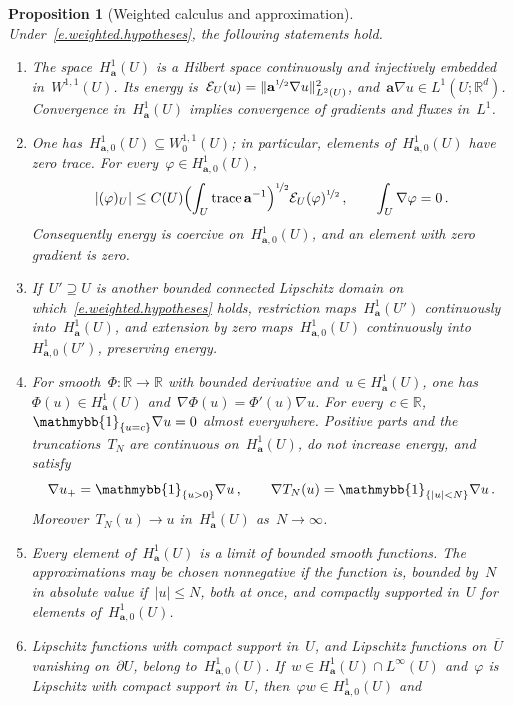 \documentclass[11pt,letterpaper]{article}
\numberwithin{equation}{section}
\newtheorem{proposition}[theorem]{Proposition}
\theoremstyle{definition}
\newcommand{\R}{\mathbb{R}}
\newcommand{\Rd}{\mathbb{R}^d}
\renewcommand{\a}{\mathbf{a}}
\newcommand{\nf}{\nicefrac}
\newcommand*{\tr}{\mathrm{trace\,}}
\DeclarePairedDelimiter{\norm}{\lVert}{\rVert}
\newcommand{\indc}{{\mathmybb{1}}}
\newcommand{\Ener}{\mathcal E}
\newcommand{\Hzero}[1]{H^1_{#1,0}}
\begin{document}
\begin{proposition}[Weighted calculus and approximation]
\label{p.weighted.calculus}
Under~\eqref{e.weighted.hypotheses}, the following statements hold.
\begin{enumerate}[label=\textup{(\roman*)}]
\item\label{i.weighted.identification} The space~$H^1_\a(U)$ is a Hilbert space continuously and injectively embedded in~$W^{1,1}(U)$. Its energy is~$\Ener_U(u)=\norm{\a^{\nf12}\nabla u}_{L^2(U)}^2$, and~$\a\nabla u\in L^1(U;\Rd)$. Convergence in~$H^1_\a(U)$ implies convergence of gradients and fluxes in~$L^1$.
\item\label{i.weighted.zero} One has~$\Hzero{\a}(U)\subseteq W^{1,1}_0(U)$; in particular, elements of~$\Hzero{\a}(U)$ have zero trace. For every~$\varphi\in\Hzero{\a}(U)$,
\begin{equation}
	|(\varphi)_U|\leq C(U)\Bigl(\int_U\tr\a^{-1}\Bigr)^{\nf12}\Ener_U(\varphi)^{\nf12}\,,\qquad \int_U\nabla\varphi=0\,.
	\label{e.weighted.coercivity}
\end{equation}
Consequently energy is coercive on~$\Hzero{\a}(U)$, and an element with zero gradient is zero.
\item\label{i.weighted.domains} If~$U'\supseteq U$ is another bounded connected Lipschitz domain on which~\eqref{e.weighted.hypotheses} holds, restriction maps~$H^1_\a(U')$ continuously into~$H^1_\a(U)$, and extension by zero maps~$\Hzero{\a}(U)$ continuously into~$\Hzero{\a}(U')$, preserving energy.
\item\label{i.weighted.chain} For smooth~$\Phi:\R\to\R$ with bounded derivative and~$u\in H^1_\a(U)$, one has~$\Phi(u)\in H^1_\a(U)$ and~$\nabla \Phi(u)=\Phi'(u)\nabla u$. For every~$c\in\R$,~$\indc_{\{u=c\}}\nabla u=0$ almost everywhere. Positive parts and the truncations~$T_N$ are continuous on~$H^1_\a(U)$, do not increase energy, and satisfy
\begin{equation}
	\nabla u_+=\indc_{\{u>0\}}\nabla u\,,\qquad \nabla T_N(u)=\indc_{\{|u|<N\}}\nabla u\,.
	\label{e.weighted.truncation.gradients}
\end{equation}
Moreover~$T_N(u)\to u$ in~$H^1_\a(U)$ as~$N\to\infty$.
\item\label{i.weighted.approximation} Every element of~$H^1_\a(U)$ is a limit of bounded smooth functions. The approximations may be chosen nonnegative if the function is, bounded by~$N$ in absolute value if~$|u|\leq N$, both at once, and compactly supported in~$U$ for elements of~$\Hzero{\a}(U)$.
\item\label{i.weighted.products} Lipschitz functions with compact support in~$U$, and Lipschitz functions on~$\overline U$ vanishing on~$\partial U$, belong to~$\Hzero{\a}(U)$. If~$w\in H^1_\a(U)\cap L^\infty(U)$ and~$\varphi$ is Lipschitz with compact support in~$U$, then~$\varphi w\in\Hzero{\a}(U)$ and

\end{enumerate}
\end{proposition}
\end{document}

